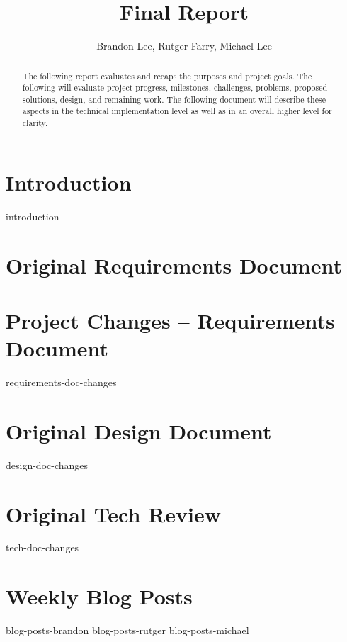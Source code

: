 \documentclass[a4paper]{article}
\title{Final Report}
\author{Brandon Lee, Rutger Farry, Michael Lee}
\begin{document}
\maketitle

\begin{abstract}
\noindent
The following report evaluates and recaps the purposes and project goals. The following will evaluate project progress, milestones, challenges, problems, proposed solutions, design, and remaining work. The following document will describe these aspects in the technical implementation level as well as in an overall higher level for clarity.
\end{abstract}

\newpage

\tableofcontents

\newpage

\section{Introduction}
{introduction}

\section{Original Requirements Document}


\section{Project Changes – Requirements Document}
{requirements-doc-changes}

\section{Original Design Document}

{design-doc-changes}

\section{Original Tech Review}

{tech-doc-changes}

\section{Weekly Blog Posts}
{blog-posts-brandon}
{blog-posts-rutger}
{blog-posts-michael}
\end{document}

